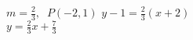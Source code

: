 {$m = \frac{2}{3}, \;\; P(-2, 1)$}
{$y - 1 = \frac{2}{3} (x+2)$ \\ $y = \frac{2}{3} x + \frac{7}{3}$}